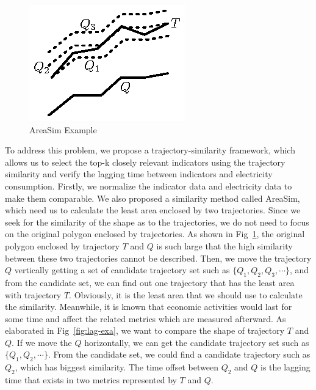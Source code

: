 \begin{figure}[!t]
	\centering
	\vspace{-0.5em}
	\includegraphics[scale=1]{fig/AreaSim-Example}
	\vspace{-1.5em}
	\caption{AreaSim Example}
	\label{fig:area-exa}
	\vspace{-1.5em}
\end{figure}

To address this problem, we propose a trajectory-similarity framework, which allows us to select the top-k closely relevant indicators using the trajectory similarity and verify the lagging time between indicators and electricity consumption. Firstly, we normalize the indicator data and electricity data to make them comparable. We also proposed a similarity method called AreaSim, which need us to calculate the least area enclosed by two trajectories. Since we seek for the similarity of the shape as to the trajectories, we do not need to focus on the original polygon enclosed by trajectories. As shown in Fig~\ref{fig:area-exa}, the original polygon enclosed by trajectory $T$ and $Q$ is such large that the high similarity between these two trajectories cannot be described. Then, we move the trajectory $Q$ vertically getting a set of candidate trajectory set such as $\{Q_1, Q_2, Q_3, \cdots \}$, and from the candidate set, we can find out one trajectory that has the least area with trajectory $T$. Obviously, it is the least area that we should use to calculate the similarity. Meanwhile, it is known that economic activities would last for some time and affect the related metrics which are measured afterward. As elaborated in Fig~\ref{fig:lag-exa}, we want to compare the shape of trajectory $T$ and $Q$. If we move the $Q$ horizontally, we can get the candidate trajectory set such as $\{Q_1, Q_2, \cdots \}$. From the candidate set, we could find a candidate trajectory such as $Q_2$, which has biggest similarity. The time offset between $Q_2$ and $Q$ is the lagging time that exists in two metrics represented by $T$ and $Q$. 

